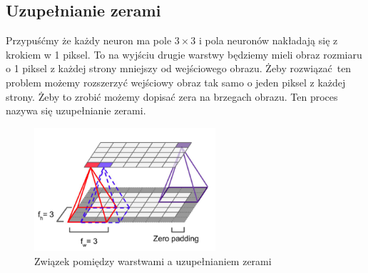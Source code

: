 \documentclass{article}
\begin{document}
\subsection{Uzupełnianie zerami}
Przypuśćmy że każdy neuron ma pole $3 \times 3$ i pola neuronów nakładają się z krokiem w 1 piksel. To na wyjściu drugie warstwy będziemy mieli obraz rozmiaru o 1 piksel z każdej strony mniejszy od wejściowego obrazu. Żeby rozwiązać ten problem możemy rozszerzyć wejściowy obraz tak samo o jeden piksel z każdej strony. Żeby to zrobić możemy dopisać zera na brzegach obrazu. Ten proces nazywa się uzupełnianie zerami.
\begin{figure}[H]
	\centering
	\includegraphics[width=0.6\textwidth,keepaspectratio=true]{padding}
	\caption{Związek pomiędzy warstwami a uzupełnianiem zerami \cite{geron}}
	\label{padding}
\end{figure}

\end{document}
